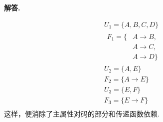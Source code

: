 \documentclass[12pt, a4paper, oneside]{ctexart}
\newenvironment{solution}{\par\noindent\textbf{解答. }}{\par}
\begin{document}
\begin{solution}
\begin{enumerate}[(1)]
$$\begin{aligned}
                    & U_1 = \{A, B, C, D\} \\
                    & \begin{aligned}
                        F_1 = \{ &A\rightarrow B, \\
                        & A\rightarrow C, \\
                        & A\rightarrow D\}
                    \end{aligned} \\
                    & U_2 = \{A, E\} \\
                    & F_2 = \{A \rightarrow E\} \\
                    & U_3 = \{E, F\} \\
                    & F_3 = \{E \rightarrow F\} \\
                \end{aligned}
            $$
            这样，便消除了主属性对码的部分和传递函数依赖.
    \end{enumerate}
\end{solution}
\end{document}
